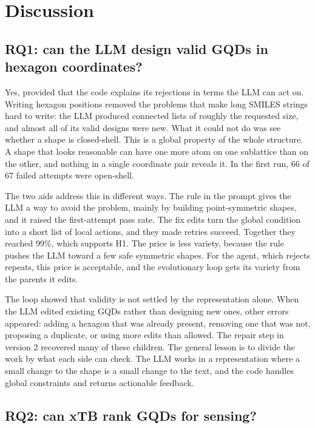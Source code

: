 \chapter{Discussion}
\label{ch:discussion}

\section{RQ1: can the LLM design valid GQDs in hexagon coordinates?}

Yes, provided that the code explains its rejections in terms the LLM can act on. Writing hexagon
positions removed the problems that make long SMILES strings hard to write: the LLM produced
connected lists of roughly the requested size, and almost all of its valid designs were new. What
it could not do was see whether a shape is closed-shell. This is a global property of the whole
structure. A shape that looks reasonable can have one more atom on one sublattice than on the
other, and nothing in a single coordinate pair reveals it. In the first run, 66 of 67 failed
attempts were open-shell.

The two aids address this in different ways. The rule in the prompt gives the LLM a way to avoid
the problem, mainly by building point-symmetric shapes, and it raised the first-attempt pass rate.
The fix edits turn the global condition into a short list of local actions, and they made retries
succeed. Together they reached 99\%, which supports H1. The price is less variety, because the
rule pushes the LLM toward a few safe symmetric shapes. For the agent, which rejects repeats, this
price is acceptable, and the evolutionary loop gets its variety from the parents it edits.

The loop showed that validity is not settled by the representation alone. When the LLM edited
existing GQDs rather than designing new ones, other errors appeared: adding a hexagon that was
already present, removing one that was not, proposing a duplicate, or using more edits than
allowed. The repair step in version 2 recovered many of these children. The general lesson is to
divide the work by what each side can check. The LLM works in a representation where a small
change to the shape is a small change to the text, and the code handles global constraints and
returns actionable feedback.

\section{RQ2: can xTB rank GQDs for \NOtwo{} sensing?}


